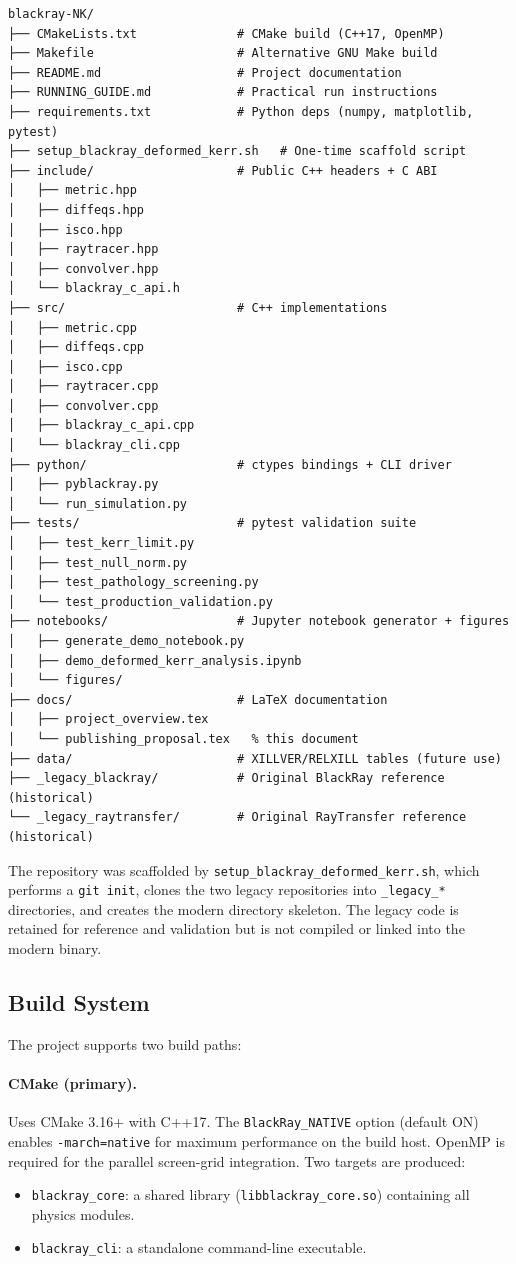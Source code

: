 \documentclass[11pt,twoside]{article}
\begin{document}
\begin{lstlisting}
blackray-NK/
├── CMakeLists.txt              # CMake build (C++17, OpenMP)
├── Makefile                    # Alternative GNU Make build
├── README.md                   # Project documentation
├── RUNNING_GUIDE.md            # Practical run instructions
├── requirements.txt            # Python deps (numpy, matplotlib, pytest)
├── setup_blackray_deformed_kerr.sh   # One-time scaffold script
├── include/                    # Public C++ headers + C ABI
│   ├── metric.hpp
│   ├── diffeqs.hpp
│   ├── isco.hpp
│   ├── raytracer.hpp
│   ├── convolver.hpp
│   └── blackray_c_api.h
├── src/                        # C++ implementations
│   ├── metric.cpp
│   ├── diffeqs.cpp
│   ├── isco.cpp
│   ├── raytracer.cpp
│   ├── convolver.cpp
│   ├── blackray_c_api.cpp
│   └── blackray_cli.cpp
├── python/                     # ctypes bindings + CLI driver
│   ├── pyblackray.py
│   └── run_simulation.py
├── tests/                      # pytest validation suite
│   ├── test_kerr_limit.py
│   ├── test_null_norm.py
│   ├── test_pathology_screening.py
│   └── test_production_validation.py
├── notebooks/                  # Jupyter notebook generator + figures
│   ├── generate_demo_notebook.py
│   ├── demo_deformed_kerr_analysis.ipynb
│   └── figures/
├── docs/                       # LaTeX documentation
│   ├── project_overview.tex
│   └── publishing_proposal.tex   % this document
├── data/                       # XILLVER/RELXILL tables (future use)
├── _legacy_blackray/           # Original BlackRay reference (historical)
└── _legacy_raytransfer/        # Original RayTransfer reference (historical)
\end{lstlisting}

The repository was scaffolded by \texttt{setup\_blackray\_deformed\_kerr.sh},
which performs a \texttt{git init}, clones the two legacy repositories into
\texttt{_legacy\_*} directories, and creates the modern directory skeleton. The
legacy code is retained for reference and validation but is not compiled or
linked into the modern binary.

\subsection{Build System}

The project supports two build paths:

\paragraph{CMake (primary).}
Uses CMake 3.16+ with C++17. The \texttt{BlackRay_NATIVE} option (default ON)
enables \texttt{-march=native} for maximum performance on the build host.
OpenMP is required for the parallel screen-grid integration. Two targets are
produced:
\begin{itemize}
\item \texttt{blackray\_core}: a shared library (\texttt{libblackray\_core.so})
containing all physics modules.
\item \texttt{blackray\_cli}: a standalone command-line executable.
\end{itemize}
\end{document}
